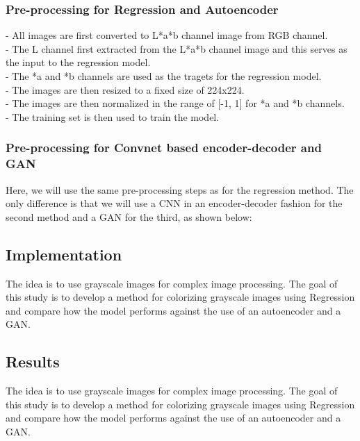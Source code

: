 \documentclass{article}
\begin{document}
\subsubsection{Pre-processing for Regression and Autoencoder}
    - All images are first converted to L*a*b channel image from RGB channel. \\
    - The L channel first extracted from the L*a*b channel image and this serves as the input to the regression model. \\
    - The *a and *b channels are used as the tragets for the regression model. \\
    - The images are then resized to a fixed size of 224x224. \\
    - The images are then normalized in the range of [-1, 1] for *a and *b channels. \\
    - The training set is then used to train the model. \\

\subsubsection{Pre-processing for Convnet based encoder-decoder and GAN}
Here, we will use the same pre-processing steps as for the regression method. 
The only difference is that we will use a CNN in an encoder-decoder fashion for the second method and a GAN for the third, as shown below:

\subsection{Implementation}
The idea is to use grayscale images for complex image processing. 
The goal of this study is to develop a method for colorizing grayscale images using Regression and
compare how the model performs against the use of an autoencoder and a GAN. 

\subsection{Results}
The idea is to use grayscale images for complex image processing. The goal of this
study is to develop a method for colorizing grayscale images using Regression and
compare how the model performs against the use of an autoencoder and a GAN. 
\end{document}
